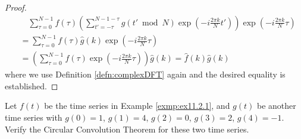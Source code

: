 \begin{proof}
\begin{align*}
&\quad \sum_{\tau=0}^{N-1} f(\tau) \left(\sum_{t'=-\tau}^{N-1-\tau} g(t' \bmod N) \exp(-i\frac{2\pi k}{N}t')\right) \exp(-i\frac{2\pi k}{N}\tau) \\
&= \sum_{\tau=0}^{N-1} f(\tau) \hat{g}(k) \exp(-i\frac{2\pi k}{N}\tau) \\
&= \left(\sum_{\tau=0}^{N-1} f(\tau) \exp(-i\frac{2\pi k}{N}\tau)\right) \hat{g}(k) = \hat{f}(k)\hat{g}(k)
\end{align*}
where we use Definition \ref{defn:complexDFT} again and the desired equality is established.
\end{proof}

\begin{exmp}
Let $f(t)$ be the time series in Example \ref{exmp:ex11.2.1}, and $g(t)$ be another time series with $g(0) = 1$, $g(1) = 4$, $g(2) = 0$, $g(3) = 2$, $g(4) = -1$. Verify the Circular Convolution Theorem for these two time series.
\end{exmp}
